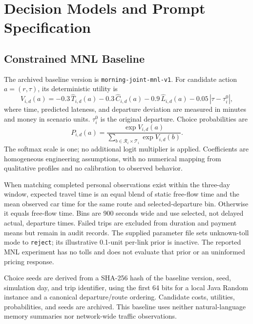 \section{Decision Models and Prompt Specification}
\label{app:decision-models}

\subsection{Constrained MNL Baseline}

The archived baseline version is \texttt{morning-joint-mnl-v1}. For candidate action $a=(r,\tau)$, its deterministic utility is
\begin{equation}
 V_{i,d}(a)=-0.3\,\widehat{T}_{i,d}(a)-0.3\,\widehat{C}_{i,d}(a)
           -0.9\,\widehat{L}_{i,d}(a)-0.05\,|\tau-\tau_i^0|,
 \label{eq:appendix-mnl}
\end{equation}
where time, predicted lateness, and departure deviation are measured in minutes and money in scenario units. $\tau_i^0$ is the original departure. Choice probabilities are
\begin{equation}
 P_{i,d}(a)=\frac{\exp V_{i,d}(a)}{\sum_{b\in\mathcal{R}_i\times\mathcal{T}_i}\exp V_{i,d}(b)}.
\end{equation}
The softmax scale is one; no additional logit multiplier is applied. Coefficients are homogeneous engineering assumptions, with no numerical mapping from qualitative profiles and no calibration to observed behavior.

When matching completed personal observations exist within the three-day window, expected travel time is an equal blend of static free-flow time and the mean observed car time for the same route and selected-departure bin. Otherwise it equals free-flow time. Bins are 900 seconds wide and use selected, not delayed actual, departure times. Failed trips are excluded from duration and payment means but remain in audit records. The supplied parameter file sets unknown-toll mode to \texttt{reject}; its illustrative 0.1-unit per-link prior is inactive. The reported MNL experiment has no tolls and does not evaluate that prior or an uninformed pricing response.

Choice seeds are derived from a SHA-256 hash of the baseline version, seed, simulation day, and trip identifier, using the first 64 bits for a local Java Random instance and a canonical departure/route ordering. Candidate costs, utilities, probabilities, and seeds are archived. This baseline uses neither natural-language memory summaries nor network-wide traffic observations.

